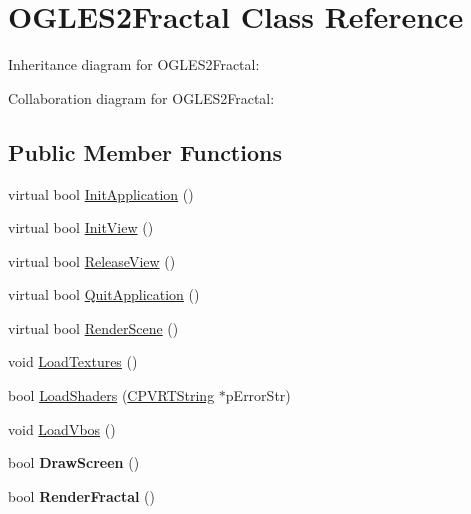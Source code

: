 \hypertarget{class_o_g_l_e_s2_fractal}{\section{O\+G\+L\+E\+S2\+Fractal Class Reference}
\label{class_o_g_l_e_s2_fractal}
}


Inheritance diagram for O\+G\+L\+E\+S2\+Fractal\+:


Collaboration diagram for O\+G\+L\+E\+S2\+Fractal\+:
\subsection*{Public Member Functions}
\begin{DoxyCompactItemize}
\item 
virtual bool \hyperlink{class_o_g_l_e_s2_fractal_a5a0476732ad67824db5172a08d6b2b20}{Init\+Application} ()
\item 
virtual bool \hyperlink{class_o_g_l_e_s2_fractal_a2842ff60922eadba18df6f1bed553045}{Init\+View} ()
\item 
virtual bool \hyperlink{class_o_g_l_e_s2_fractal_a5dd4997d0afdca2291936287e833a64c}{Release\+View} ()
\item 
virtual bool \hyperlink{class_o_g_l_e_s2_fractal_a371772b287a1647392624475ff2cf4f0}{Quit\+Application} ()
\item 
virtual bool \hyperlink{class_o_g_l_e_s2_fractal_ac9d49e29257d923fe0af6a134abc71f1}{Render\+Scene} ()
\item 
void \hyperlink{class_o_g_l_e_s2_fractal_a19228e82e722c40a63d1eabae14bad1b}{Load\+Textures} ()
\item 
bool \hyperlink{class_o_g_l_e_s2_fractal_a8eacf405c0f8557250f23029d8695048}{Load\+Shaders} (\hyperlink{class_c_p_v_r_t_string}{C\+P\+V\+R\+T\+String} $\ast$p\+Error\+Str)
\item 
void \hyperlink{class_o_g_l_e_s2_fractal_a97670da498c1fb2ef78ad32a67122dab}{Load\+Vbos} ()
\item 
\hypertarget{class_o_g_l_e_s2_fractal_ab5a6e3c601798999842a7a98e5d3e932}{bool {\bfseries Draw\+Screen} ()}\label{class_o_g_l_e_s2_fractal_ab5a6e3c601798999842a7a98e5d3e932}

\item 
\hypertarget{class_o_g_l_e_s2_fractal_ab28df051e753dfc153d27dc30f733f2c}{bool {\bfseries Render\+Fractal} ()}\label{class_o_g_l_e_s2_fractal_ab28df051e753dfc153d27dc30f733f2c}

\end{DoxyCompactItemize}


